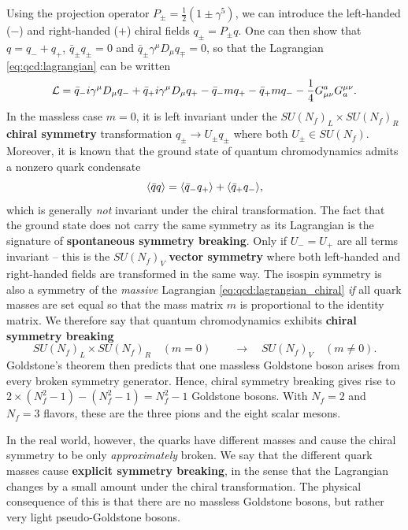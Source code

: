 Using the projection operator $P_\pm = \frac12 (1 \pm \gamma^5)$, we can introduce the left-handed ($-$) and right-handed ($+$) chiral fields $q_\pm = P_\pm q$.
One can then show that $q = q_- + q_+$, $\bar{q}_\pm q_\pm = 0$ and $\bar{q}_\pm \gamma^\mu D_\mu q_\mp = 0$, so that the Lagrangian \eqref{eq:qcd:lagrangian} can be written
\begin{equation}
	\mathcal{L} = \bar{q}_- i \gamma^\mu D_\mu q_- + \bar{q}_+ i \gamma^\mu D_\mu q_+ - \bar{q}_- m q_+ - \bar{q}_+ m q_- - \frac14 G_{\mu\nu}^a G^{\mu\nu}_a.
\label{eq:qcd:lagrangian_chiral}
\end{equation}
In the massless case $m=0$,
it is left invariant under the $SU(N_f)_L \times SU(N_f)_R$ \textbf{chiral symmetry} transformation $q_\pm \rightarrow U_\pm q_\pm$ where both $U_\pm \in SU(N_f)$.
Moreover, it is known that the ground state of quantum chromodynamics admits a nonzero quark condensate \cite[chapter 28]{ref:schwartz}
\begin{equation}
	\avg{\bar{q} q} %
	                                                            = \avg{\bar{q}_- q_+} + \avg{\bar{q}_+ q_-},
\end{equation}
which is generally \emph{not} invariant under the chiral transformation.
The fact that the ground state does not carry the same symmetry as its Lagrangian is the signature of \textbf{spontaneous symmetry breaking}.
Only if $U_- = U_+$ are all terms invariant -- this is the $SU(N_f)_V$ \textbf{vector symmetry} where both left-handed and right-handed fields are transformed in the same way.
The isospin symmetry is also a symmetry of the \emph{massive} Lagrangian \eqref{eq:qcd:lagrangian_chiral} \emph{if} all quark masses are set equal so that the mass matrix $m$ is proportional to the identity matrix.
We therefore say that quantum chromodynamics exhibits \textbf{chiral symmetry breaking}
\begin{equation}
	SU(N_f)_L \times SU(N_f)_R \quad (m = 0) \qquad \rightarrow \quad SU(N_f)_V \quad (m \neq 0).
\end{equation}
Goldstone's theorem then predicts that one massless Goldstone boson arises from every broken symmetry generator.
Hence, chiral symmetry breaking gives rise to $2 \times (N_f^2 - 1) - (N_f^2 - 1) = N_f^2 - 1$ Goldstone bosons.
With $N_f = 2$ and $N_f = 3$ flavors, these are the three pions and the eight scalar mesons.

In the real world, however, the quarks have different masses and cause the chiral symmetry to be only \emph{approximately} broken.
We say that the different quark masses cause \textbf{explicit symmetry breaking}, in the sense that the Lagrangian changes by a small amount under the chiral transformation.
The physical consequence of this is that there are no massless Goldstone bosons, but rather very light pseudo-Goldstone bosons.

